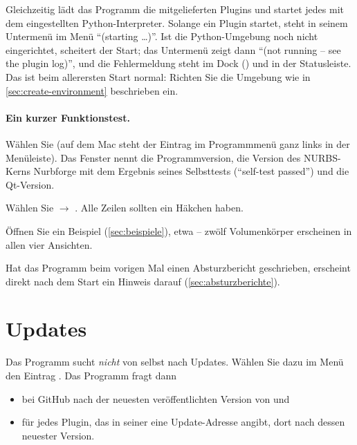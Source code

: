 Gleichzeitig lädt das Programm die mitgelieferten Plugins und startet jedes mit dem
eingestellten Python-Interpreter. Solange ein Plugin startet, steht in seinem Untermenü im
Menü  \enquote{(starting \dots)}. Ist die Python-Umgebung noch nicht
eingerichtet, scheitert der Start; das Untermenü zeigt dann \enquote{(not running -- see the
plugin log)}, und die Fehlermeldung steht im Dock  ()
und in der Statusleiste. Das ist beim allerersten Start normal: Richten Sie die Umgebung wie
in \autoref{sec:create-environment} beschrieben ein.

\paragraph{Ein kurzer Funktionstest.}
\begin{schritte}
  \item Wählen Sie  (auf dem Mac steht der Eintrag im
    Programmmenü  ganz links in der Menüleiste). Das Fenster nennt die Programmversion, die Version des
    NURBS-Kerns Nurbforge mit dem Ergebnis seines Selbsttests (\enquote{self-test passed})
    und die Qt-Version.
  \item Wählen Sie  $\to$ . Alle Zeilen
    sollten ein Häkchen haben.
  \item Öffnen Sie ein Beispiel (\autoref{sec:beispiele}), etwa  --
    zwölf Volumenkörper erscheinen in allen vier Ansichten.
\end{schritte}

\begin{hinweis}
Hat das Programm beim vorigen Mal einen Absturzbericht geschrieben, erscheint direkt nach dem
Start ein Hinweis darauf (\autoref{sec:absturzberichte}).
\end{hinweis}

\section{Updates}\label{sec:updates}

Das Programm sucht \emph{nicht} von selbst nach Updates. Wählen Sie dazu im Menü
 den Eintrag . Das Programm fragt dann

\begin{itemize}
  \item bei GitHub nach der neuesten veröffentlichten Version von \produkt{} und
  \item für jedes Plugin, das in seiner  eine Update-Adresse angibt, dort
    nach dessen neuester Version.
\end{itemize}

